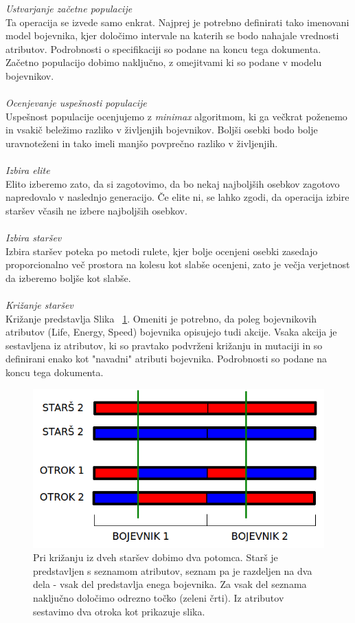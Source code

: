 \documentclass[12pt,a4paper,openany]{book}
\begin{document}
\textit{Ustvarjanje začetne populacije}\\
Ta operacija se izvede samo enkrat. Najprej je potrebno definirati tako imenovani model bojevnika, kjer določimo intervale na katerih se bodo nahajale vrednosti atributov. Podrobnosti o specifikaciji so podane na koncu tega dokumenta. Začetno populacijo dobimo naključno, z omejitvami ki so podane v modelu bojevnikov.
\\\\
\textit{Ocenjevanje uspešnosti populacije}\\
Uspešnost populacije ocenjujemo z \textit{minimax} algoritmom, ki ga večkrat poženemo in vsakič beležimo razliko v življenjih bojevnikov. Boljši osebki bodo bolje uravnoteženi in tako imeli manjšo povprečno razliko v življenjih.
\\\\
\textit{Izbira elite}\\
Elito izberemo zato, da si zagotovimo, da bo nekaj najboljših osebkov zagotovo napredovalo v naslednjo generacijo. Če elite ni, se lahko zgodi, da operacija izbire staršev včasih ne izbere najboljših osebkov.
\\\\
\textit{Izbira staršev}\\
Izbira staršev poteka po metodi rulete, kjer bolje ocenjeni osebki zasedajo proporcionalno več prostora na kolesu kot slabše ocenjeni, zato je večja verjetnost da izberemo boljše kot slabše.
\\\\
\textit{Križanje staršev}\\
Križanje predstavlja Slika ~\ref{fig:krizanje}. Omeniti je potrebno, da poleg bojevnikovih atributov (Life, Energy, Speed) bojevnika opisujejo tudi akcije. Vsaka akcija je sestavljena iz atributov, ki so pravtako podvrženi križanju in mutaciji in so definirani enako kot "navadni" atributi bojevnika. Podrobnosti so podane na koncu tega dokumenta.
\begin{figure}[ht]
 \centering
 \includegraphics[width=12cm]{krizanje.png}
 \caption[Križanje starsev]{Pri križanju iz dveh staršev dobimo dva potomca. Starš je predstavljen s seznamom atributov, seznam pa je razdeljen na dva dela - vsak del predstavlja enega bojevnika. Za vsak del seznama naključno določimo odrezno točko (zeleni črti). Iz atributov sestavimo dva otroka kot prikazuje slika.}
 \label{fig:krizanje}
\end{figure}
\end{document}
